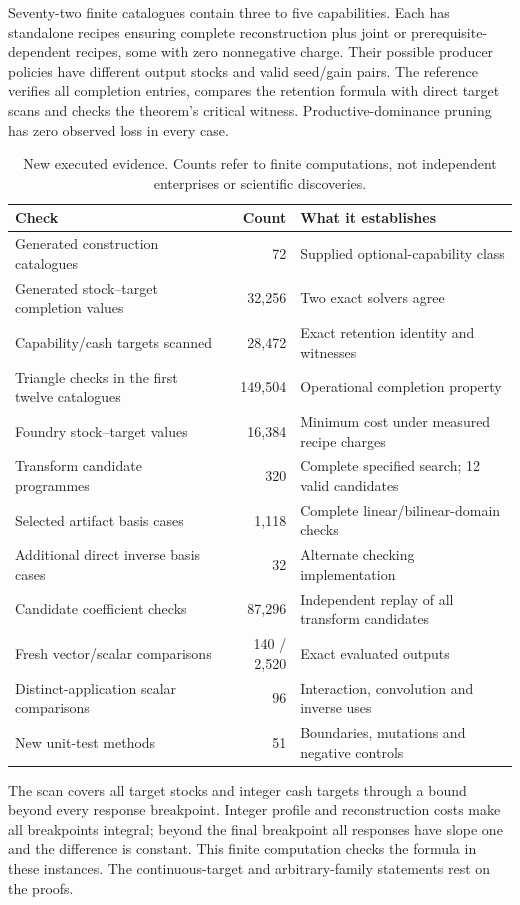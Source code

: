 \documentclass[11pt,letterpaper]{article}
\theoremstyle{definition}\newtheorem{definition}[theorem]{Definition}
\theoremstyle{remark}\newtheorem{remark}[theorem]{Remark}
\begin{document}
Seventy-two finite catalogues contain three to five capabilities. Each has standalone recipes ensuring complete reconstruction plus joint or prerequisite-dependent recipes, some with zero nonnegative charge. Their possible producer policies have different output stocks and valid seed/gain pairs. The reference verifies all completion entries, compares the retention formula with direct target scans and checks the theorem's critical witness. Productive-dominance pruning has zero observed loss in every case.

\begin{table}[htbp]\centering\small
\caption{New executed evidence. Counts refer to finite computations, not independent enterprises or scientific discoveries.}
\begin{tabularx}{\linewidth}{@{}YrY@{}}\toprule
Check & Count & What it establishes\\\midrule
Generated construction catalogues & 72 & Supplied optional-capability class\\
Generated stock--target completion values & 32,256 & Two exact solvers agree\\
Capability/cash targets scanned & 28,472 & Exact retention identity and witnesses\\
Triangle checks in the first twelve catalogues & 149,504 & Operational completion property\\
Foundry stock--target values & 16,384 & Minimum cost under measured recipe charges\\
Transform candidate programmes & 320 & Complete specified search; 12 valid candidates\\
Selected artifact basis cases & 1,118 & Complete linear/bilinear-domain checks\\
Additional direct inverse basis cases & 32 & Alternate checking implementation\\
Candidate coefficient checks & 87,296 & Independent replay of all transform candidates\\
Fresh vector/scalar comparisons & 140 / 2,520 & Exact evaluated outputs\\
Distinct-application scalar comparisons & 96 & Interaction, convolution and inverse uses\\
New unit-test methods & 51 & Boundaries, mutations and negative controls\\\bottomrule
\end{tabularx}
\label{tab:counts}
\end{table}

The scan covers all target stocks and integer cash targets through a bound beyond every response breakpoint. Integer profile and reconstruction costs make all breakpoints integral; beyond the final breakpoint all responses have slope one and the difference is constant. This finite computation checks the formula in these instances. The continuous-target and arbitrary-family statements rest on the proofs.
\end{document}

